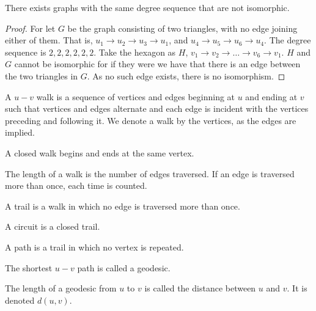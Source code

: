         \begin{theorem}
        There exists graphs with the same degree sequence that are not
        isomorphic.
        \end{theorem}
        \begin{proof}
        For let $G$ be the graph consisting of two triangles, with no edge joining either of them. That is, $u_1\rightarrow u_2 \rightarrow u_3\rightarrow u_1$, and $u_4\rightarrow u_5 \rightarrow u_6 \rightarrow u_4$. The degree sequence is $2,2,2,2,2,2$. Take the hexagon as $H$, $v_1\rightarrow v_2 \rightarrow \hdots \rightarrow v_6 \rightarrow v_1$. $H$ and $G$ cannot be isomorphic for if they were we have that there is an edge between the two triangles in $G$. As no such edge exists, there is no isomorphism.
        \end{proof}
        \begin{definition}
        A $u-v$ walk is a sequence of vertices and edges beginning at $u$ and ending at $v$ such that vertices and edges alternate and each edge is incident with the vertices preceding and following it. We denote a walk by the vertices, as the edges are implied.
        \end{definition}
        \begin{definition}
        A closed walk begins and ends at the same vertex.
        \end{definition}
        \begin{definition}
        The length of a walk is the number of edges traversed. If an edge is traversed more than once, each time is counted.
        \end{definition}
        \begin{definition}
        A trail is a walk in which no edge is traversed more than once.
        \end{definition}
        \begin{definition} A circuit is a closed trail.
        \end{definition}
        \begin{definition}
        A path is a trail in which no vertex is repeated.
        \end{definition}
        \begin{definition}
        The shortest $u-v$ path is called a geodesic.
        \end{definition}
        \begin{definition}
        The length of a geodesic from $u$ to $v$ is called the distance between $u$ and $v$. It is denoted $d(u,v)$.
        \end{definition}
